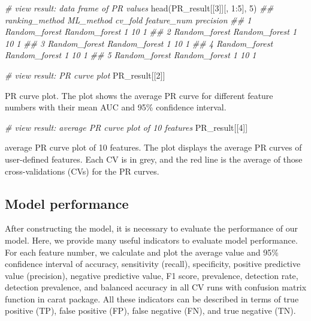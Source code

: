 \documentclass[]{article}
\newcommand{\hlnum}[1]{\textcolor[rgb]{0.816,0.125,0.439}{#1}}%
\newcommand{\hlcom}[1]{\textcolor[rgb]{0.502,0.502,0.502}{\textit{#1}}}%
\newcommand{\hlopt}[1]{\textcolor[rgb]{0,0,0}{#1}}%
\newcommand{\hlstd}[1]{\textcolor[rgb]{0.251,0.251,0.251}{#1}}%
\newcommand{\hlkwd}[1]{\textcolor[rgb]{0.878,0.439,0.125}{#1}}%
\newenvironment{Shaded}{\begin{myshaded}}{\end{myshaded}}
\newcommand{\KeywordTok}[1]{\hlkwd{#1}}
\newcommand{\DecValTok}[1]{\hlnum{#1}}
\newcommand{\CommentTok}[1]{\hlcom{#1}}
\newcommand{\OperatorTok}[1]{\hlopt{#1}}
\newcommand{\NormalTok}[1]{\hlstd{#1}}
\begin{document}
\begin{Shaded}
\begin{Highlighting}[]
\CommentTok{# view result: data frame of PR values}
\KeywordTok{head}\NormalTok{(PR_result[[}\DecValTok{3}\NormalTok{]][, }\DecValTok{1}\OperatorTok{:}\DecValTok{5}\NormalTok{], }\DecValTok{5}\NormalTok{)}
\CommentTok{##   ranking_method     ML_method cv_fold feature_num precision}
\CommentTok{## 1  Random_forest Random_forest       1          10         1}
\CommentTok{## 2  Random_forest Random_forest       1          10         1}
\CommentTok{## 3  Random_forest Random_forest       1          10         1}
\CommentTok{## 4  Random_forest Random_forest       1          10         1}
\CommentTok{## 5  Random_forest Random_forest       1          10         1}
\end{Highlighting}
\end{Shaded}

\begin{Shaded}
\begin{Highlighting}[]
\CommentTok{# view result: PR curve plot}
\NormalTok{PR_result[[}\DecValTok{2}\NormalTok{]]}
\end{Highlighting}
\end{Shaded}

\label{fig:unnamed-chunk-57}PR curve plot. The plot shows the average PR curve for different feature numbers with their mean AUC and 95\% confidence interval.

\begin{Shaded}
\begin{Highlighting}[]
\CommentTok{# view result: average PR curve plot of 10 features}
\NormalTok{PR_result[[}\DecValTok{4}\NormalTok{]]    }
\end{Highlighting}
\end{Shaded}

\label{fig:unnamed-chunk-58}average PR curve plot of 10 features. The plot displays the average PR curves of user-defined features. Each CV is in grey, and the red line is the average of those cross-validations (CVs) for the PR curves.

\hypertarget{model-performance}{%
\subsection{Model performance}\label{model-performance}}

After constructing the model, it is necessary to evaluate the performance of our model. Here, we provide many useful indicators to evaluate model performance. For each feature number, we calculate and plot the average value and 95\% confidence interval of accuracy, sensitivity (recall), specificity, positive predictive value (precision), negative predictive value, F1 score, prevalence, detection rate, detection prevalence, and balanced accuracy in all CV runs with confusion matrix function in carat package. All these indicators can be described in terms of true positive (TP), false positive (FP), false negative (FN), and true negative (TN).
\end{document}
